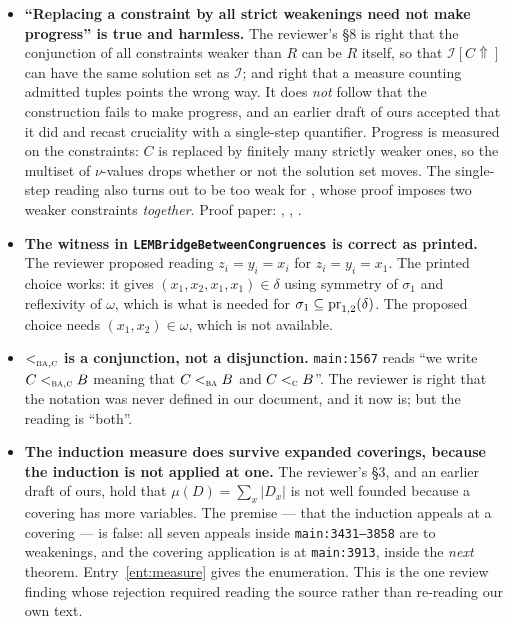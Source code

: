 \begin{itemize}\tightlist
\item \textbf{``Replacing a constraint by all strict weakenings need not make
  progress'' is true and harmless.} The reviewer's \S8 is right that the
  conjunction of all constraints weaker than $R$ can be $R$ itself, so that
  $\mathcal I[C\Uparrow]$ can have the same solution set as $\mathcal I$; and
  right that a measure counting admitted tuples points the wrong way. It does
  \emph{not} follow that the construction fails to make progress, and an
  earlier draft of ours accepted that it did and recast cruciality with a
  single-step quantifier. Progress is measured on the constraints: $C$ is
  replaced by finitely many strictly weaker ones, so the multiset of
  $\nu$-values drops whether or not the solution set moves. The single-step
  reading also turns out to be too weak for
  , whose proof imposes two weaker constraints
  \emph{together}. Proof paper: ,
  , .
\item \textbf{The witness in \texttt{LEMBridgeBetweenCongruences} is correct as
  printed.} The reviewer proposed reading $z_{i}=y_{i}=x_{i}$ for
  $z_{i}=y_{i}=x_{1}$. The printed choice works: it gives
  $(x_{1},x_{2},x_{1},x_{1})\in\delta$ using symmetry of $\sigma_{1}$ and
  reflexivity of $\omega$, which is what is needed for
  $\sigma_{1}\subseteq\operatorname*{pr}_{1,2}(\delta)$. The proposed choice needs
  $(x_{1},x_{2})\in\omega$, which is not available.
\item \textbf{$<_{\textup{\textsc{ba}},\textup{\textsc{c}}}^{}$ is a conjunction, not a disjunction.}
  \texttt{main:1567} reads ``we write $C<_{\textup{\textsc{ba}},\textup{\textsc{c}}}B$ meaning that
  $C<_{\textup{\textsc{ba}}}B$ and $C<_{\textup{\textsc{c}}}B$''. The reviewer is right that the notation was
  never defined in our document, and it now is; but the reading is ``both''.
\item \textbf{The induction measure does survive expanded coverings, because
  the induction is not applied at one.} The reviewer's \S3, and an earlier
  draft of ours, hold that $\mu(D)=\sum_{x}|D_{x}|$ is not well founded
  because a covering has more variables. The premise --- that the induction
  appeals at a covering --- is false: all seven appeals inside
  \texttt{main:3431--3858} are to weakenings, and the covering application is
  at \texttt{main:3913}, inside the \emph{next} theorem. Entry~\ref{ent:measure}
  gives the enumeration. This is the one review finding whose rejection
  required reading the source rather than re-reading our own text.
\end{itemize}

